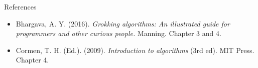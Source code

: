 \documentclass[
  ignorenonframetext,
]{beamer}
\begin{document}
\begin{frame}{References}
\protect\hypertarget{references}{}
\begin{itemize}
\item
  Bhargava, A. Y. (2016). \emph{Grokking algorithms: An illustrated
  guide for programmers and other curious people.} Manning. Chapter 3
  and 4.
\item
  Cormen, T. H. (Ed.). (2009). \emph{Introduction to algorithms} (3rd
  ed). MIT Press. Chapter 4.
\end{itemize}
\end{frame}
\end{document}
